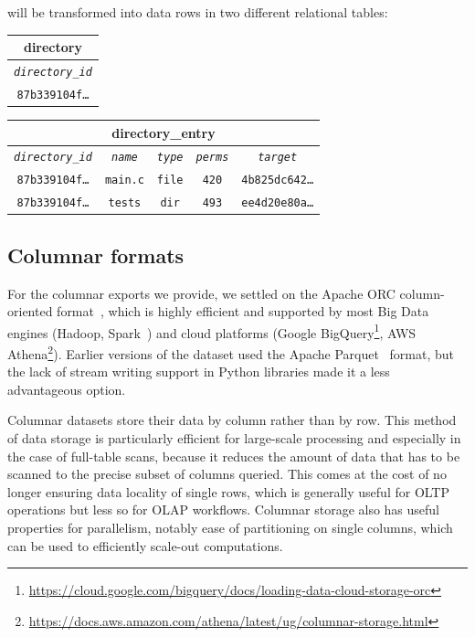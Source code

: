 \noindent will be transformed into data rows in two different relational
tables:

\vspace{1em}

\begin{center}
\begin{tabular}{|c|}
    \multicolumn{1}{c}{\textbf{directory}} \\ \hline
    \emph{\texttt{directory\_id}} \\ \hline
    \texttt{87b339104f\ldots} \\ \hline
\end{tabular}
\qquad
\begin{tabular}{|c|c|c|c|c|}
    \multicolumn{5}{c}{\textbf{directory\_entry}} \\ \hline
    \emph{\texttt{directory\_id}} & \emph{\texttt{name}} & \emph{\texttt{type}}
                                  & \emph{\texttt{perms}} &
                                  \emph{\texttt{target}} \\ \hline
    \texttt{87b339104f\ldots} & \texttt{main.c} & \texttt{file} & \texttt{420}
                              & \texttt{4b825dc642\ldots} \\ \hline
    \texttt{87b339104f\ldots} & \texttt{tests} & \texttt{dir} & \texttt{493}
                              & \texttt{ee4d20e80a\ldots} \\ \hline
\end{tabular}
\end{center}

\subsection{Columnar formats}
For the columnar exports we provide, we settled on the Apache ORC
column-oriented format~\cite{huai2014orc}, which is highly efficient and
supported by most Big Data engines (Hadoop, Spark~\cite{zaharia2016apache}) and
cloud platforms (Google
BigQuery\footnote{\url{https://cloud.google.com/bigquery/docs/loading-data-cloud-storage-orc}},
AWS
Athena\footnote{\url{https://docs.aws.amazon.com/athena/latest/ug/columnar-storage.html}}).
Earlier versions of the dataset used the Apache
Parquet~\cite{twitter2013parquet,website-apache-parquet} format, but the lack
of stream writing support in Python libraries made it a less advantageous
option.

Columnar datasets store their data by column rather than by row. This method of
data storage is particularly efficient for large-scale processing and
especially in the case of full-table scans, because it reduces the amount of
data that has to be scanned to the precise subset of columns queried. This
comes at the cost of no longer ensuring data locality of single rows, which is
generally useful for \gls{OLTP} operations but less so for \gls{OLAP}
workflows. Columnar storage also has useful properties for parallelism, notably
ease of partitioning on single columns, which can be used to efficiently
scale-out computations.

